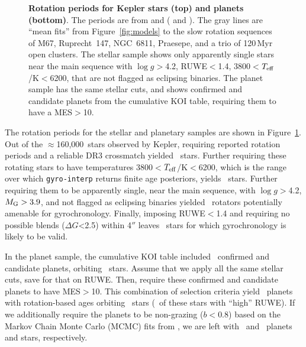 \documentclass[11pt,twocolumn,tighten]{aastex63}
\newcommand{\nkeplerstars}{$\approx$160{,}000}
\begin{document}
\begin{figure}[!t]
	\begin{center}
	
		\vspace{-0.5cm}
	\end{center}
	\vspace{-0.5cm}
	\caption{
    {\bf Rotation periods for Kepler stars (top) and planets (bottom)}.
    The periods are from \citet{Santos_2019} and \citet{Santos_2021}
    ( and ).  The
    gray lines are ``mean fits'' from Figure~\ref{fig:models} to the slow
    rotation sequences of M67, Ruprecht~147, NGC~6811, Praesepe, and a trio of 120\,Myr open clusters.
    The stellar sample shows
    only apparently single stars near the main sequence with $\log
    g$$>$4.2, RUWE$<$1.4, 3800$<$$T_{\rm eff}$/K$<$6200, that are not
    flagged as eclipsing binaries.  The planet sample has the same
    stellar cuts, and shows confirmed and candidate planets from the
    cumulative KOI table, requiring them to have a MES$>$10.
	}
	\label{fig:prot_vs_teff}
\end{figure}

The rotation periods for the stellar and planetary samples are shown
in Figure~\ref{fig:prot_vs_teff}.  Out of the \nkeplerstars\ stars
observed by Kepler, requiring reported rotation periods and a
reliable DR3 crossmatch yielded
\nuniqstarsantosrot\ stars.  Further requiring these rotating stars
to have temperatures 3800$<$$T_{\rm eff}$/K$<$6200, which is the range
over which \texttt{gyro-interp} returns finite age posteriors,
yields \nuniqstarsantosrotteffcut\ stars.
Further requiring them to be apparently single, near the main
sequence, with $\log g$$>$4.2, $M_{\rm G}>3.9$, and not flagged as
eclipsing binaries yielded \nuniqstarsantosallbutruwe\ rotators
potentially amenable for gyrochronology.
Finally, imposing RUWE$<$1.4 and requiring no possible blends ($\Delta
G$<2.5) within 4$''$ leaves \nuniqstarsantosrotgyroappl\ stars for
which gyrochronology is likely to be valid.


In the planet sample, the cumulative KOI table included
\nnonfpcumkois\ confirmed and candidate planets, orbiting
\nnonfpcumkoihosts\ stars.  Assume that we apply all the same stellar
cuts, save for that on RUWE.
Then,
require these confirmed and candidate planets to have MES$>$10.
This combination of selection criteria
yield \nplwgyroagewithgrazingandhighruwe\ planets with rotation-based
ages orbiting \nplhoststarwgyroagewithgrazingandhighruwe\ stars
(\nplhoststarwgyroagejusthighruwe\ of these stars with ``high'' RUWE).
If we additionally require the planets to be non-grazing ($b<0.8$)
based on the Markov Chain Monte Carlo (MCMC) fits from
\citet{Thompson_2018}, we are left with \nplwgyroagenograzing\ and
\nplhoststarwgyroagenograzing\ planets and stars, respectively.
\end{document}
